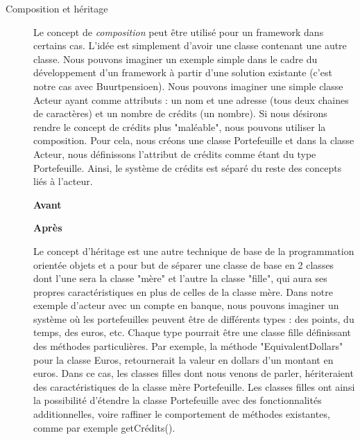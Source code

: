 \begin{description}

\item[Composition et héritage]
Le concept de \textit{composition} peut être utilisé pour un framework dans certains cas.  L'idée est simplement d'avoir une classe contenant une autre classe.  Nous pouvons imaginer un exemple simple dans le cadre du développement d'un framework à partir d'une solution existante (c'est notre cas avec Buurtpensioen).  Nous pouvons imaginer une simple classe Acteur ayant comme attributs : un nom et  une adresse (tous deux chaines de caractères) et un nombre de crédits (un nombre).  Si nous désirons rendre le concept de crédits plus "maléable",  nous pouvons utiliser la composition.  Pour cela,  nous créons une classe Portefeuille et dans la classe Acteur,  nous définissons l'attribut de crédits comme étant du type Portefeuille.  Ainsi,  le système de crédits est séparé du reste des concepts liés à l'acteur.  

\begin{minipage}{.5\textwidth}
\begin{center} \textbf{Avant}


\end{center}
\end{minipage}
\hspace{0.3cm}
\begin{minipage}{.5\textwidth}
\begin{center} \textbf{Après}\end{center}


\end{minipage}
\vspace{0.3cm}

Le concept d'héritage est une autre technique de base de la programmation orientée objets et a pour but de séparer une classe de base en 2 classes dont l'une sera la classe "mère" et l'autre la classe "fille",  qui aura ses propres caractéristiques en plus de celles de la classe mère.  Dans notre exemple d'acteur avec un compte en banque,  nous pouvons imaginer un système où les portefeuilles peuvent être de différents types : des points,  du temps,  des euros,  etc.  Chaque type pourrait être une classe fille définissant des méthodes particulières.  Par exemple,  la méthode "EquivalentDollars" pour la classe Euros,  retournerait la valeur en dollars d'un montant en euros.  Dans ce cas,  les classes filles dont nous venons de parler,  hériteraient des caractéristiques de la classe mère Portefeuille.  Les classes filles ont ainsi la possibilité d'étendre la classe Portefeuille avec des fonctionnalités additionnelles,  voire raffiner le comportement de méthodes existantes,  comme par exemple getCrédits().


\end{description}
